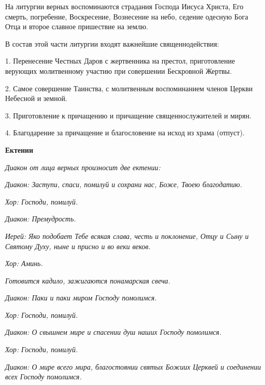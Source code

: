    На литургии верных воспоминаются страдания Господа Иисуса Христа,
Его смерть, погребение, Воскресение, Вознесение на небо, седение одесную
Бога Отца и второе славное пришествие на землю.


   В состав этой части литургии входят важнейшие священнодействия:
     


1. Перенесение                  Честных                  Даров                  с
     жертвенника на престол, приготовление верующих молитвенному
     участию при совершении Бескровной Жертвы.
     


2. Самое   совершение   Таинства,   с   молитвенным   воспоминанием
     членов Церкви Небесной и земной.
     


3. Приготовление к причащению и причащение священнослужителей
     и мирян.
     


4. Благодарение за причащение и благословение на исход из храма
     (отпуст).
     




\bfseries Ектении\normalfont{}


 \itshape Диакон от лица верных произносит две ектении:\normalfont{}


 \itshape Диакон:\normalfont{} Заступи, спаси, помилуй и сохрани нас, Боже, Твоею
благодатию.


 \itshape Хор:\normalfont{} Господи, помилуй.


 \itshape Диакон:\normalfont{} Премудрость.



 \itshape Иерей:\normalfont{} Яко подобает Тебе всякая слава, честь и поклонение, Отцу и Сыну
и Святому Духу, ныне и присно и во веки веков.


 \itshape Хор:\normalfont{} Аминь.


 \itshape Готовится кадило, зажигаются понамарская свеча.\normalfont{}


 \itshape Диакон:\normalfont{} Паки и паки миром Господу помолимся.


 \itshape Хор:\normalfont{} Господи, помилуй.


 \itshape Диакон:\normalfont{} О свышнем мире и спасении душ наших Господу помолимся.


 \itshape Хор:\normalfont{} Господи, помилуй.


 \itshape Диакон:\normalfont{} О мире всего мира, благостоянии святых Божиих Церквей и
соединении всех Господу помолимся.


